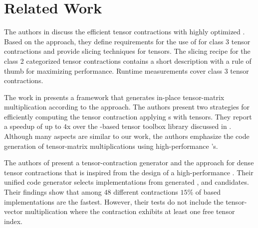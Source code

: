 \section{Related Work}
\label{sec:related}


The authors in \cite{dinapoli:2014:towards.efficient.use} discuss the efficient tensor contractions with highly optimized . 
Based on the  approach, they define requirements for the use of  for class 3 tensor contractions and provide slicing techniques for tensors. %
The slicing recipe for the class 2 categorized tensor contractions contains a short description with a rule of thumb for maximizing performance.
Runtime measurements cover class 3 tensor contractions.

%
The work in \cite{li:2015:input} presents a framework that generates in-place tensor-matrix multiplication according to the  approach. 
The authors present two strategies for efficiently computing the tensor contraction applying s with tensors.
They report a speedup of up to $4$x over the -based  tensor toolbox library discussed in \cite{bader:2006:algorithm862}.
Although many aspects are similar to our work, the authors emphasize the code generation of tensor-matrix multiplications using high-performance 's.

%
The authors of \cite{springer:2018:design} present a tensor-contraction generator  and the  approach for dense tensor contractions that is inspired from the design of a high-performance .
Their unified code generator selects implementations from generated ,  and  candidates.
Their findings show that among $48$ different contractions $15$\% of  based implementations are the fastest.
However, their tests do not include the tensor-vector multiplication where the contraction exhibits at least one free tensor index.
%

